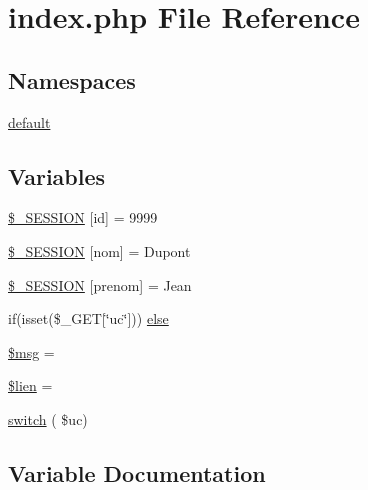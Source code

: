 \hypertarget{index_8php}{}\section{index.\+php File Reference}
\label{index_8php}
\subsection*{Namespaces}
\begin{DoxyCompactItemize}
\item 
 \hyperlink{namespacedefault}{default}
\end{DoxyCompactItemize}
\subsection*{Variables}
\begin{DoxyCompactItemize}
\item 
\hyperlink{index_8php_afd32d91eae19937855ca0925217b1ee7}{\$\+\_\+\+S\+E\+S\+S\+I\+ON} \mbox{[}\textquotesingle{}id\textquotesingle{}\mbox{]} = 9999
\item 
\hyperlink{index_8php_a4576793cee11bb3cbdb5315e59bb160e}{\$\+\_\+\+S\+E\+S\+S\+I\+ON} \mbox{[}\textquotesingle{}nom\textquotesingle{}\mbox{]} = \textquotesingle{}Dupont\textquotesingle{}
\item 
\hyperlink{index_8php_af03871362a113a2cd8dc1a3eb1eeeab3}{\$\+\_\+\+S\+E\+S\+S\+I\+ON} \mbox{[}\textquotesingle{}prenom\textquotesingle{}\mbox{]} = \textquotesingle{}Jean\textquotesingle{}
\item 
if(isset(\$\+\_\+\+G\+ET\mbox{[}\char`\"{}uc\char`\"{}\mbox{]})) \hyperlink{index_8php_ad8d90d57846b673749ff47f30033c9d5}{else}
\item 
\hyperlink{index_8php_a9e168f4152c267835864153c54449583}{\$msg} = \textquotesingle{}\textquotesingle{}
\item 
\hyperlink{index_8php_a110fc80fcb224fbae884b1a3742c4924}{\$lien} = \textquotesingle{}\textquotesingle{}
\item 
\hyperlink{index_8php_ad8b865a1d8ce58c6c02891bb8f66bef6}{switch} ( \$uc)
\end{DoxyCompactItemize}


\subsection{Variable Documentation}
\mbox{\label{index_8php_afd32d91eae19937855ca0925217b1ee7}} 
